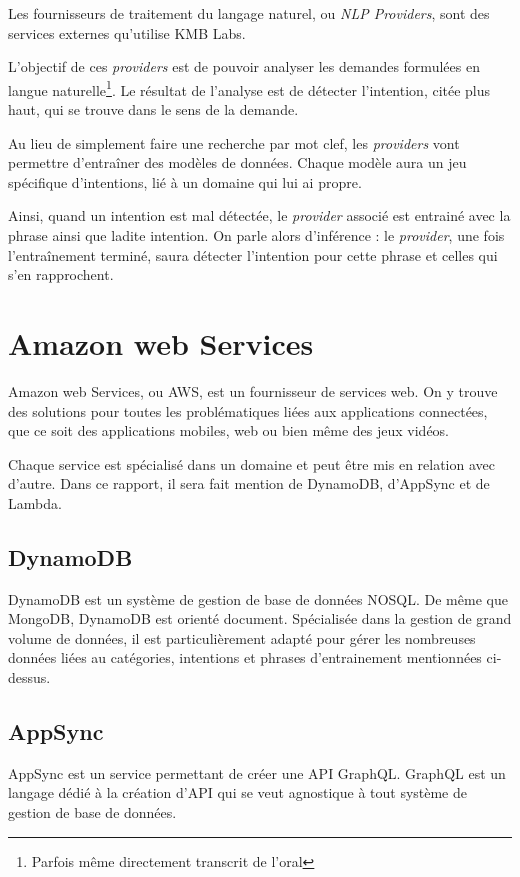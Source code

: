 \documentclass[12pt,a4paper,oneside]{scrreprt}
\begin{document}
Les fournisseurs de traitement du langage naturel, ou \textit{NLP Providers}, sont des services externes qu'utilise KMB Labs.

L'objectif de ces \textit{providers} est de pouvoir analyser les demandes formulées en langue naturelle\footnote{Parfois même directement transcrit de l'oral}. Le résultat de l'analyse est de détecter l'intention, citée plus haut, qui se trouve dans le sens de la demande.

Au lieu de simplement faire une recherche par mot clef, les \textit{providers} vont permettre d'entraîner des modèles de données. Chaque modèle aura un jeu spécifique d'intentions, lié à un domaine qui lui ai propre.

Ainsi, quand un intention est mal détectée, le \textit{provider} associé est entrainé avec la phrase ainsi que ladite intention. On parle alors d'inférence : le \textit{provider}, une fois l'entraînement terminé, saura détecter l'intention pour cette phrase et celles qui s'en rapprochent.

\section{Amazon web Services}

Amazon web Services, ou AWS, est un fournisseur de services web. On y trouve des solutions pour toutes les problématiques liées aux applications connectées, que ce soit des applications mobiles, web ou bien même des jeux vidéos.

Chaque service est spécialisé dans un domaine et peut être mis en relation avec d'autre. Dans ce rapport, il sera fait mention de DynamoDB, d'AppSync et de Lambda.

\subsection*{DynamoDB}

DynamoDB est un système de gestion de base de données NOSQL. De même que MongoDB, DynamoDB est orienté document. Spécialisée dans la gestion de grand volume de données, il est particulièrement adapté pour gérer les nombreuses données liées au catégories, intentions et phrases d'entrainement mentionnées ci-dessus.

\subsection*{AppSync}

AppSync est un service permettant de créer une API GraphQL. GraphQL est un langage dédié à la création d'API qui se veut agnostique à tout système de gestion de base de données.
\end{document}
